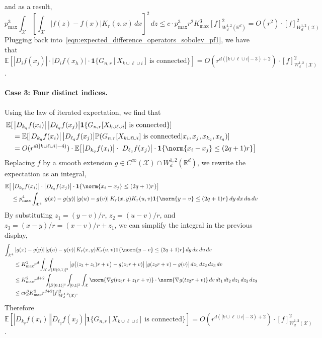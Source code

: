 \documentclass{article}
\newcommand{\Reals}{\mathbb{R}}
\newcommand{\abs}[1]{\left \lvert #1 \right \rvert}
\newcommand{\1}{\mathbf{1}}
\newcommand{\Rd}{\Reals^d}
\newcommand{\Xset}{\mathcal{X}}
\newcommand{\Pbb}{\mathbb{P}}
\newcommand{\Ebb}{\mathbb{E}}
\theoremstyle{alden}
\theoremstyle{aldenthm}
\theoremstyle{definition}
\theoremstyle{remark}
\begin{document}
and as a result, 
\begin{equation*}
p_{\max}^3 \int_{\Xset} \left[\int_{\Xset} \abs{f(z) - f(x)} K_r(z,x) \,dx\right]^2 \,dz \leq c\cdot p_{\max}^3 r^2 K_{\max}^3 [f]_{W_d^{1,2}(\Rd)}^2 = O(r^2)\cdot [f]_{W_d^{1,2}(\Xset)}^2
\end{equation*}
Plugging back into~\eqref{eqn:expected_difference_operators_sobolev_pf1}, we have that $\Ebb \left[\abs{D_{i}f(x_j)} \cdot \abs{D_if(x_h)} \cdot \1\{G_{n,r}[X_{k \cup \ell \cup i}] ~\textrm{is connected} \}\right] = O(r^{d(\abs{k \cup \ell \cup i} - 3) + 2}) \cdot [f]_{W_d^{1,2}(\Xset)}^2$.

\paragraph{Case 3: Four distinct indices.}
Using the law of iterated expectation, we find that
\begin{align*}
\Ebb[ &\abs{D_{k_q}f(x_i)}{\abs{D_{\ell_q}f(x_j)}} \1\{G_{n,r}[X_{k \cup \ell \cup i}] ~\textrm{is connected} \}] \\
& = \Ebb[\abs{D_{k_q}f(x_i)}{\abs{D_{\ell_q}f(x_j)}} \Pbb(G_{n,r}[X_{k \cup \ell \cup i}] ~\textrm{is connected}|x_i,x_j,x_{k_q},x_{\ell_q})] \\
& = O(r^{d(\abs{k \cup \ell \cup i} - 4)}) \cdot \Ebb\bigl[\abs{D_{k_q}f(x_i)}\cdot{\abs{D_{\ell_q}f(x_j)}}\cdot\1\{\norm{x_i - x_j} \leq (2q + 1)r\}\bigr] 
\end{align*}
Replacing $f$ by a smooth extension $g \in C^{\infty}(\Xset) \cap W_d^{1,2}(\Rd)$, we rewrite the expectation as an integral,
\begin{align*}
\Ebb\bigl[& \abs{D_{k_q}f(x_i)}\cdot{\abs{D_{\ell_q}f(x_j)}}\cdot\1\{\norm{x_i - x_j} \leq (2q + 1)r\}\bigr] \\
& \leq p_{\max}^4 \int_{\Xset^4} \abs{g(x) - g(y)} \abs{g(u) - g(v)} K_r(x,y) K_r(u,v) \1\{\norm{y - v} \leq (2q + 1)r\} \,dy \,dx \,du \,dv
\end{align*}
By substituting $z_1 = (y - v)/r$, $z_2 = (u - v)/r$, and $z_3 = (x - y)/r = (x - v)/r + z_1$, we can simplify the integral in the previous display,
\begin{align*}
\int_{\Xset^4} & \abs{g(x) - g(y)} \abs{g(u) - g(v)} K_r(x,y) K_r(u,v) \1\{\norm{y - v} \leq (2q + 1)r\} \,dy \,dx \,du \,dv \\
& \leq K_{\max}^2 r^d \int_{\Xset} \int_{[B(0,1)]^3} \abs{g\bigl((z_3 + z_1)r + v\bigr) - g(z_1r + v)} \bigl|g(z_2r + v) - g(v)\bigr| \,dz_1 \,dz_2 \,dz_3 \,dv \\
& \leq  K_{\max}^2 r^{d + 2} \int_{[B(0,1)]^3} \int_{[0,1]^2} \int_{\Xset} \norm{\nabla g(t z_3 r + z_1r + v)} \cdot \norm{\nabla g(t z_2 r + v)} \,dv \,dt_1 \,dt_2 \,dz_1 \,dz_2 \,dz_3 \\
& \leq c \nu_d^3 K_{\max}^2 r^{d + 2} [f]_{W_{d}^{1,2}(\Xset)}^2.
\end{align*}
Therefore $\Ebb[ \abs{D_{k_q}f(x_i)}{\abs{D_{\ell_q}f(x_j)}} \1\{G_{n,r}[X_{k \cup \ell \cup i}] ~\textrm{is connected} \}] = O(r^{d(\abs{k \cup \ell \cup i} - 3) + 2})\cdot [f]_{W_d^{1,2}(\Xset)}^2$. 
\end{document}
